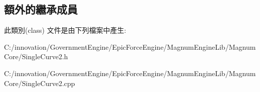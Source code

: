 \subsection*{額外的繼承成員}


此類別(class) 文件是由下列檔案中產生\+:\begin{DoxyCompactItemize}
\item 
C\+:/innovation/\+Government\+Engine/\+Epic\+Force\+Engine/\+Magnum\+Engine\+Lib/\+Magnum\+Core/Single\+Curve2.\+h\item 
C\+:/innovation/\+Government\+Engine/\+Epic\+Force\+Engine/\+Magnum\+Engine\+Lib/\+Magnum\+Core/Single\+Curve2.\+cpp\end{DoxyCompactItemize}
